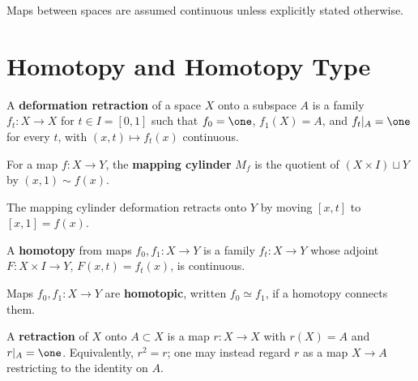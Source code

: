 
Maps between spaces are assumed continuous unless explicitly stated otherwise.

\section{Homotopy and Homotopy Type}

\begin{definition}
\label{def:deformation-retraction}
\leanok
{}
A \textbf{deformation retraction} of a space $X$ onto a subspace $A$ is a family
$f_t:X\to X$ for $t\in I=[0,1]$ such that $f_0=\one$, $f_1(X)=A$, and
$f_t|_A=\one$ for every $t$, with $(x,t)\mapsto f_t(x)$ continuous.
\end{definition}

\begin{definition}
\label{def:mapping-cylinder}
\leanok
For a map $f:X\to Y$, the \textbf{mapping cylinder} $M_f$ is the quotient of
$(X\times I)\sqcup Y$ by $(x,1)\sim f(x)$.
\end{definition}

The mapping cylinder deformation retracts onto $Y$ by moving $[x,t]$ to $[x,1]=f(x)$.

\begin{definition}[Homotopy]
\label{def:homotopy}
\leanok
A \textbf{homotopy} from maps $f_0,f_1:X\to Y$ is a family $f_t:X\to Y$ whose
adjoint $F:X\times I\to Y$, $F(x,t)=f_t(x)$, is continuous.
\end{definition}

\begin{definition}
\label{def:homotopic-maps}
\leanok
{}
Maps $f_0,f_1:X\to Y$ are \textbf{homotopic}, written $f_0\simeq f_1$, if a homotopy
connects them.
\end{definition}

\begin{definition}[Retraction]
\label{def:retraction}
\leanok
A \textbf{retraction} of $X$ onto $A\subset X$ is a map $r:X\to X$ with
$r(X)=A$ and $r|_A=\one$. Equivalently, $r^2=r$; one may instead regard $r$ as
a map $X\to A$ restricting to the identity on $A$.
\end{definition}


